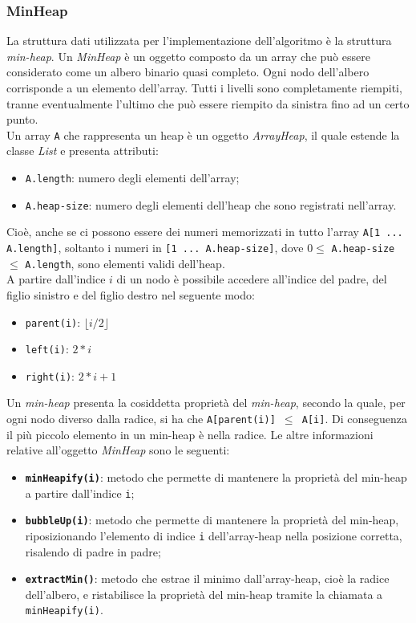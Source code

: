 	\subsubsection{MinHeap}
		La struttura dati utilizzata per l'implementazione dell'algoritmo è la struttura \textit{min-heap}. 
		Un \emph{MinHeap} è un oggetto composto da un array che può essere considerato come un albero binario quasi completo. 
		Ogni nodo dell'albero corrisponde a un elemento dell'array. 
		Tutti i livelli sono completamente riempiti, tranne eventualmente l'ultimo che può essere riempito da sinistra fino ad un certo punto.\\
		Un array \texttt{A} che rappresenta un heap è un oggetto \emph{ArrayHeap}, il quale estende la classe \emph{List} e presenta attributi:
		\begin{itemize}
			\item \texttt{A.length}: numero degli elementi dell'array;
			\item \texttt{A.heap-size}: numero degli elementi dell'heap che sono registrati nell'array.
		\end{itemize}
		Cioè, anche se ci possono essere dei numeri memorizzati in tutto l'array \texttt{A[1 ... A.length]}, soltanto i numeri in \texttt{[1 ... A.heap-size]}, dove $0 \leq$ \texttt{A.heap-size} $\leq$ \texttt{A.length}, sono elementi validi dell'heap.\\
		A partire dall'indice $i$ di un nodo è possibile accedere all'indice del padre, del figlio sinistro e del figlio destro nel seguente modo:
		\begin{itemize}
			\item \texttt{parent(i)}: $\lfloor i/2 \rfloor$ 
			\item \texttt{left(i)}: $2 \ast i$
			\item \texttt{right(i)}: $2 \ast i + 1$
		\end{itemize}
		Un \textit{min-heap} presenta la cosiddetta proprietà del \textit{min-heap}, secondo la quale, per ogni nodo diverso dalla radice, si ha che \texttt{A[parent(i)] $\leq$ A[i]}. Di conseguenza il più piccolo elemento in un min-heap è nella radice.
		Le altre informazioni relative all'oggetto \emph{MinHeap} sono le seguenti:
		\begin{itemize}
				\item \texttt{\textbf{minHeapify(i)}}: metodo che permette di mantenere la proprietà del min-heap a partire dall'indice \texttt{i};
				\item \texttt{\textbf{bubbleUp(i)}}: metodo che permette di mantenere la proprietà del min-heap, riposizionando l'elemento di indice \texttt{i} dell'array-heap nella posizione corretta, risalendo di padre in padre;
				\item \texttt{\textbf{extractMin()}}: metodo che estrae il minimo dall'array-heap, cioè la radice dell'albero, e ristabilisce la proprietà del min-heap tramite la chiamata a \texttt{minHeapify(i)}.
		\end{itemize}
		
